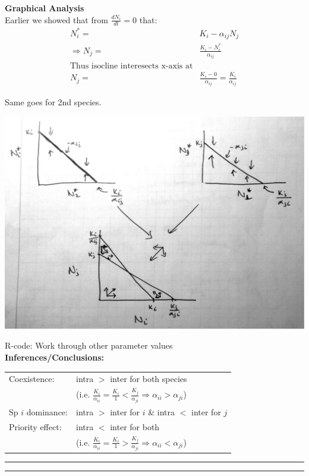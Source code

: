 \documentclass{article}
\newcommand{\note}[1]{\colorbox{gray!30}{#1}}
\newcommand{\ind}{\-\hspace{1cm}}
\begin{document}
\textbf{Graphical Analysis}\\
Earlier we showed that from $\frac{dN_i}{dt}=0$ that:
\begin{align*}
	N_i^* = & K_i - \alpha_{ij} N_j\\
	\Rightarrow N_j = & \frac{K_i-N_i^*}{\alpha_{ij}}\\
	\text{Thus isocline interesects x-axis at}\\
  N_j = & \frac{K_i-0}{\alpha_{ij}}=\frac{K_i}{\alpha_{ij}}
	\end{align*}

Same goes for 2nd species.
\begin{center}
\includegraphics[width=17cm]{figs/LV_comp_isoclines.pdf}
\end{center}
\note{R-code: Work through other parameter values}\\

\textbf{Inferences/Conclusions:}

\begin{table}[h]
\centering
\begin{tabular}{ll}
Coexistence: & intra $>$ inter for both species  \\
& \ind \ind (i.e. $\frac{K_i}{\alpha_{ii}}=\frac{K_i}{1} < \frac{K_j}{\alpha_{ji}} \Rightarrow \alpha_{ii}>\alpha_{ji}$)\\
Sp $i$ dominance: & intra $>$ inter for $i$ \& intra $<$ inter for $j$\\
Priority effect: & intra $<$ inter for both\\
& \ind \ind (i.e. $\frac{K_i}{\alpha_{ii}}=\frac{K_i}{1} > \frac{K_j}{\alpha_{ji}} \Rightarrow \alpha_{ii}<\alpha_{ji}$)
\end{tabular} 
\end{table}

\rule[0.5ex]{\linewidth}{1pt}
\rule[0.5ex]{\linewidth}{1pt}
\end{document}
